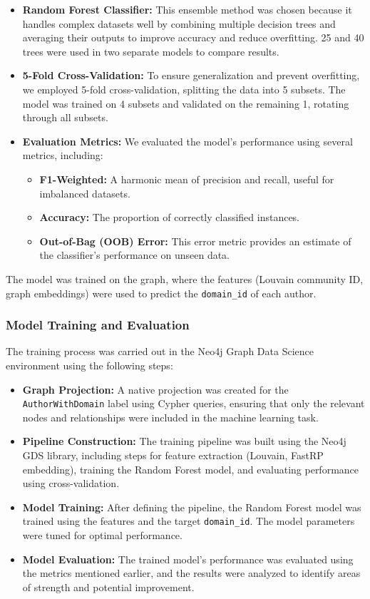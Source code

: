 \documentclass[conference, 12pt]{IEEEtran}
\begin{document}
\begin{itemize}
  \item \textbf{Random Forest Classifier:} This ensemble method was chosen because it handles complex datasets well by 
  combining multiple decision trees and averaging their outputs to improve accuracy and reduce overfitting. 25 and 40 trees
  were used in two separate models to compare results.
  \item \textbf{5-Fold Cross-Validation:} To ensure generalization and prevent overfitting, we employed 5-fold 
  cross-validation, splitting the data into 5 subsets. The model was trained on 4 subsets and validated on the remaining 1, 
  rotating through all subsets.
  \item \textbf{Evaluation Metrics:} We evaluated the model's performance using several metrics, including:
    \begin{itemize}
      \item \textbf{F1-Weighted:} A harmonic mean of precision and recall, useful for imbalanced datasets.
      \item \textbf{Accuracy:} The proportion of correctly classified instances.
      \item \textbf{Out-of-Bag (OOB) Error:} This error metric provides an estimate of the classifier’s performance on 
      unseen data.
    \end{itemize}
\end{itemize}

The model was trained on the graph, where the features (Louvain community ID, graph embeddings) were used to 
predict the \texttt{domain\_id} of each author.

\subsubsection{Model Training and Evaluation}
The training process was carried out in the Neo4j Graph Data Science environment using the following steps:

\begin{itemize}
  \item \textbf{Graph Projection:} A native projection was created for the \texttt{AuthorWithDomain} label using 
  Cypher queries, ensuring that only the relevant nodes and relationships were included in the machine learning task.
  \item \textbf{Pipeline Construction:} The training pipeline was built using the Neo4j GDS library, including steps for 
  feature extraction (Louvain, FastRP embedding), training the Random Forest model, and evaluating performance using 
  cross-validation.
  \item \textbf{Model Training:} After defining the pipeline, the Random Forest model was trained using the features and 
  the target \texttt{domain\_id}. The model parameters were tuned for optimal performance.
  \item \textbf{Model Evaluation:} The trained model's performance was evaluated using the metrics mentioned earlier, 
  and the results were analyzed to identify areas of strength and potential improvement.
\end{itemize}
\end{document}
